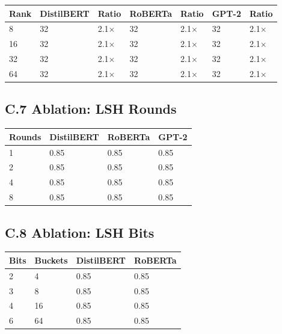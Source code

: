 \begin{table}[H]
\centering
\small
\begin{tabular}{lllllll}
\toprule
\textbf{Rank} & \textbf{DistilBERT} & \textbf{Ratio} & \textbf{RoBERTa} & \textbf{Ratio} & \textbf{GPT-2} & \textbf{Ratio} \\
\midrule
8 & 32 & 2.1$\times$ & 32 & 2.1$\times$ & 32 & 2.1$\times$ \\
16 & 32 & 2.1$\times$ & 32 & 2.1$\times$ & 32 & 2.1$\times$ \\
32 & 32 & 2.1$\times$ & 32 & 2.1$\times$ & 32 & 2.1$\times$ \\
64 & 32 & 2.1$\times$ & 32 & 2.1$\times$ & 32 & 2.1$\times$ \\
\bottomrule
\end{tabular}
\end{table}

\subsection{C.7 Ablation: LSH Rounds}

\begin{table}[H]
\centering
\small
\begin{tabular}{llll}
\toprule
\textbf{Rounds} & \textbf{DistilBERT} & \textbf{RoBERTa} & \textbf{GPT-2} \\
\midrule
1 & 0.85 & 0.85 & 0.85 \\
2 & 0.85 & 0.85 & 0.85 \\
4 & 0.85 & 0.85 & 0.85 \\
8 & 0.85 & 0.85 & 0.85 \\
\bottomrule
\end{tabular}
\end{table}

\subsection{C.8 Ablation: LSH Bits}

\begin{table}[H]
\centering
\small
\begin{tabular}{llll}
\toprule
\textbf{Bits} & \textbf{Buckets} & \textbf{DistilBERT} & \textbf{RoBERTa} \\
\midrule
2 & 4 & 0.85 & 0.85 \\
3 & 8 & 0.85 & 0.85 \\
4 & 16 & 0.85 & 0.85 \\
6 & 64 & 0.85 & 0.85 \\
\bottomrule
\end{tabular}
\end{table}

